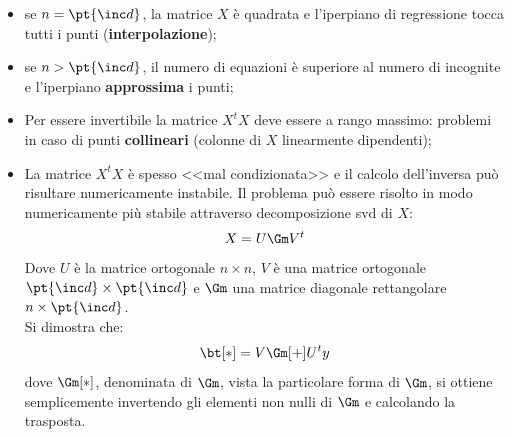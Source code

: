 \begin{note}
    \begin{itemize}
    \item se $n = \pt{\inc d}$, la matrice $X$ è quadrata e l'iperpiano di regressione tocca tutti i punti (\textbf{interpolazione});
    \item se $n > \pt{\inc d}$, il numero di equazioni è superiore al numero di incognite e l'iperpiano \textbf{approssima} i punti;
    \item Per essere invertibile la matrice $X^tX$ deve essere a rango massimo: problemi in caso di punti \textbf{collineari} (colonne di $X$ linearmente dipendenti);
    \item La matrice $X^tX$ è spesso <<mal condizionata>> e il calcolo dell'inversa può risultare numericamente instabile.
        Il problema può essere risolto in modo numericamente più stabile attraverso decomposizione \ac{svd} di $X$:
        \[
            X = U\Gm V^t
        \]
        Dove $U$ è la matrice ortogonale $n\times n$, $V$ è una matrice ortogonale $\pt{\inc d} \times \pt{\inc d}$ e $\Gm$ una matrice diagonale rettangolare $n \times \pt{\inc d}$.
        \\
        Si dimostra che:
        \[
            \bt[*] = V\Gm[+]U^ty
        \]
        dove $\Gm[*]$, denominata  di $\Gm$, vista la particolare forma di $\Gm$, si ottiene semplicemente invertendo gli elementi non nulli di $\Gm$ e calcolando la trasposta.
    \end{itemize}
\end{note}
